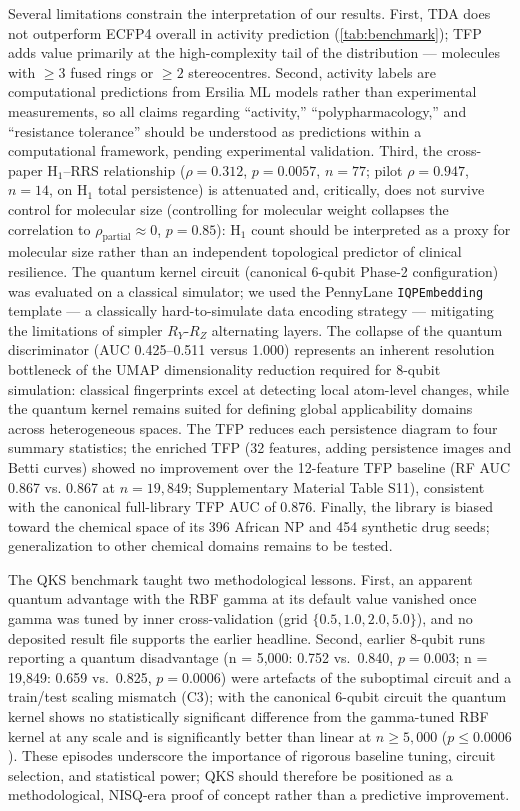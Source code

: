 \documentclass[11pt,a4paper]{article}
\begin{document}
Several limitations constrain the interpretation of our results. First, TDA does not outperform ECFP4 overall in activity prediction (\cref{tab:benchmark}); TFP adds value primarily at the high-complexity tail of the distribution --- molecules with $\geq 3$ fused rings or $\geq 2$ stereocentres. Second, activity labels are computational predictions from Ersilia ML models rather than experimental measurements, so all claims regarding ``activity,'' ``polypharmacology,'' and ``resistance tolerance'' should be understood as predictions within a computational framework, pending experimental validation. Third, the cross-paper H$_1$--RRS relationship ($\rho = 0.312$, $p = 0.0057$, $n = 77$; pilot $\rho = 0.947$, $n = 14$, on H$_1$ total persistence) is attenuated and, critically, does not survive control for molecular size (controlling for molecular weight collapses the correlation to $\rho_{\text{partial}} \approx 0$, $p = 0.85$): H$_1$ count should be interpreted as a proxy for molecular size rather than an independent topological predictor of clinical resilience. The quantum kernel circuit (canonical 6-qubit Phase-2 configuration) was evaluated on a classical simulator; we used the PennyLane \texttt{IQPEmbedding} template --- a classically hard-to-simulate data encoding strategy --- mitigating the limitations of simpler $R_Y$-$R_Z$ alternating layers. The collapse of the quantum discriminator (AUC \num{0.425}--0.511 versus 1.000) represents an inherent resolution bottleneck of the UMAP dimensionality reduction required for 8-qubit simulation: classical fingerprints excel at detecting local atom-level changes, while the quantum kernel remains suited for defining global applicability domains across heterogeneous spaces. The TFP reduces each persistence diagram to four summary statistics; the enriched TFP (32 features, adding persistence images and Betti curves) showed no improvement over the 12-feature TFP baseline (RF AUC \num{0.867} vs. 0.867 at $n = 19{,}849$; Supplementary Material Table S11), consistent with the canonical full-library TFP AUC of 0.876. Finally, the library is biased toward the chemical space of its 396 African NP and 454 synthetic drug seeds; generalization to other chemical domains remains to be tested.

The QKS benchmark taught two methodological lessons. First, an apparent quantum advantage with the RBF gamma at its default value vanished once gamma was tuned by inner cross-validation (grid $\{0.5, 1.0, 2.0, 5.0\}$), and no deposited result file supports the earlier headline. Second, earlier 8-qubit runs reporting a quantum disadvantage (n = 5,000: \num{0.752} vs.\ \num{0.840}, $p = 0.003$; n = 19,849: \num{0.659} vs.\ \num{0.825}, $p = 0.0006$) were artefacts of the suboptimal circuit and a train/test scaling mismatch (C3); with the canonical 6-qubit circuit the quantum kernel shows no statistically significant difference from the gamma-tuned RBF kernel at any scale and is significantly better than linear at $n \geq 5{,}000$ ($p \leq 0.0006$). These episodes underscore the importance of rigorous baseline tuning, circuit selection, and statistical power; QKS should therefore be positioned as a methodological, NISQ-era proof of concept rather than a predictive improvement.
\end{document}
